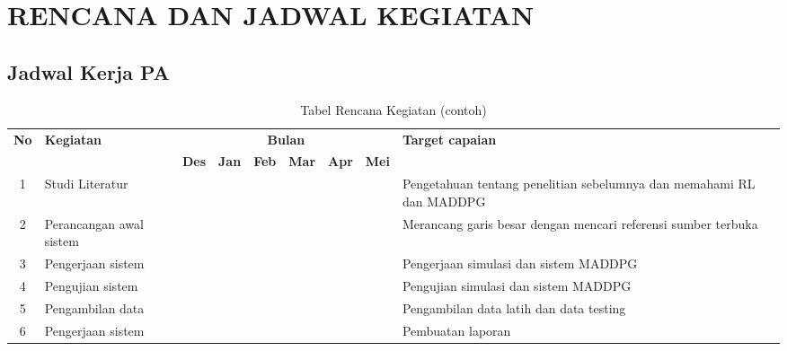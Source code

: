 \chapter[RENCANA DAN JADWAL KEGIATAN]{\\ RENCANA DAN JADWAL KEGIATAN}

\section{Jadwal Kerja PA}
\lipsum[2][4]

\begin{table}[h!]
    \centering
    \caption{Tabel Rencana Kegiatan (contoh)}
    \begin{tabular}{|c|p{2.5cm}|c|c|c|c|c|c|p{3.5cm}|}
    \hline
    \multirow{2}{*}{\textbf{No}} & \multirow{2}{*}{\textbf{Kegiatan}} & \multicolumn{6}{c|}{\textbf{Bulan}} & \multirow{2}{*}{\textbf{Target capaian}} \\ \cline{3-8} 
    
    & & \textbf{Des} & \textbf{Jan} & \textbf{Feb} & \textbf{Mar} & \textbf{Apr} & \textbf{Mei} & \\ \hline
    
    1 & Studi Literatur & \cellcolor[HTML]{C0C0C0} & \cellcolor[HTML]{C0C0C0} & \cellcolor[HTML]{C0C0C0} & & & & Pengetahuan tentang penelitian sebelumnya dan memahami RL dan MADDPG \\ \hline
    2 & Perancangan awal sistem & & \cellcolor[HTML]{C0C0C0} & \cellcolor[HTML]{C0C0C0} & & & & Merancang garis besar dengan mencari referensi sumber terbuka \\ \hline
    3 & Pengerjaan sistem & & & \cellcolor[HTML]{C0C0C0} & \cellcolor[HTML]{C0C0C0} & & & Pengerjaan simulasi dan sistem MADDPG \\ \hline
    4 & Pengujian sistem & & & & \cellcolor[HTML]{C0C0C0} & \cellcolor[HTML]{C0C0C0} & & Pengujian simulasi dan sistem MADDPG \\ \hline
    5 & Pengambilan data & & & & \cellcolor[HTML]{C0C0C0} & \cellcolor[HTML]{C0C0C0} & & Pengambilan data latih dan data testing \\ \hline
    6 & Pengerjaan sistem & & & & & \cellcolor[HTML]{C0C0C0} & \cellcolor[HTML]{C0C0C0} & Pembuatan laporan \\ \hline
    \end{tabular}
\end{table}


